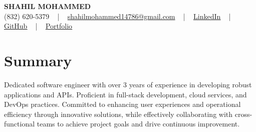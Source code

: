 \documentclass[letterpaper,10pt]{article}
\begin{document}
\begin{center}
    {\fontsize{14pt}{12pt}\selectfont \textbf{\MakeUppercase{Shahil Mohammed}}}\\ \vspace{2pt}
    \fontsize{10pt}{12pt}\selectfont (832) 620-5379 ~ | ~ \href{mailto:shahilmohammed14786@gmail.com}{shahilmohammed14786@gmail.com} ~ | ~  
    \href{https://www.linkedin.com/in/shahil-mohammed-9652931a1/}{\color{blue}\underline{LinkedIn}}  ~ | ~ 
    \href{https://github.com/freakbeast14}{\color{blue}\underline{GitHub}} ~ | ~ 
    \href{https://shahil-mohammed.netlify.app/}{\color{blue}\underline{Portfolio}}
    \vspace{-8pt}
\end{center}

\section{Summary}
\vspace{-2pt}\fontsize{8pt}{9pt}\selectfont
Dedicated software engineer with over 3 years of experience in developing robust applications and APIs. Proficient in full-stack development, cloud services, and DevOps practices. Committed to enhancing user experiences and operational efficiency through innovative solutions, while effectively collaborating with cross-functional teams to achieve project goals and drive continuous improvement.
 \vspace{-5pt}
 
\vspace{-2pt}
\end{document}
